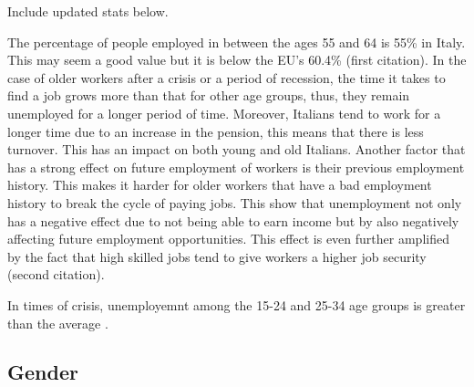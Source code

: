 \documentclass[12pt]{article}
\begin{document}
\begin{spacing}{1.5}

Include updated stats below.

The percentage of people employed in between the ages 55 and 64 is 55\% in Italy. This may seem a good value but it is below the EU's 60.4\% (first citation). In the case of older workers after a crisis or a period of recession, the time it takes to find a job grows more than that for other age groups, thus, they remain unemployed for a longer period of time. Moreover, Italians tend to work for a longer time due to an increase in the pension, this means that there is less turnover. This has an impact on both young and old Italians. Another factor that has a strong effect on future employment of workers is their previous employment history. This makes it harder for older workers that have a bad employment history to break the cycle of paying jobs. This show that unemployment not only has a negative effect due to not being able to earn income but by also negatively affecting future employment opportunities. This effect is even further amplified by the fact that high skilled jobs tend to give workers a higher job security (second citation). 

In times of crisis, unemployemnt among the 15-24 and 25-34 age groups is greater than the average \cite{pontecorvo2018giovani}.

\end{spacing}

\subsection{Gender}
\end{document}
